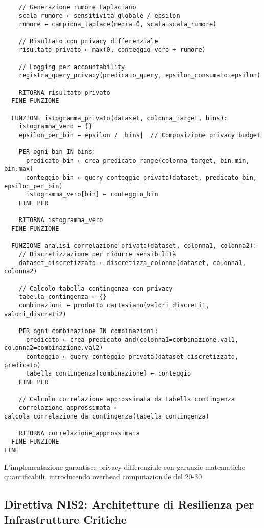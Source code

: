 {\begin{verbatim}
    // Generazione rumore Laplaciano
    scala_rumore ← sensitività_globale / epsilon
    rumore ← campiona_laplace(media=0, scala=scala_rumore)
    
    // Risultato con privacy differenziale
    risultato_privato ← max(0, conteggio_vero + rumore)
    
    // Logging per accountability
    registra_query_privacy(predicato_query, epsilon_consumato=epsilon)
    
    RITORNA risultato_privato
  FINE FUNZIONE
  
  FUNZIONE istogramma_privato(dataset, colonna_target, bins):
    istogramma_vero ← {}
    epsilon_per_bin ← epsilon / |bins|  // Composizione privacy budget
    
    PER ogni bin IN bins:
      predicato_bin ← crea_predicato_range(colonna_target, bin.min, bin.max)
      conteggio_bin ← query_conteggio_privata(dataset, predicato_bin, epsilon_per_bin)
      istogramma_vero[bin] ← conteggio_bin
    FINE PER
    
    RITORNA istogramma_vero
  FINE FUNZIONE
  
  FUNZIONE analisi_correlazione_privata(dataset, colonna1, colonna2):
    // Discretizzazione per ridurre sensibilità
    dataset_discretizzato ← discretizza_colonne(dataset, colonna1, colonna2)
    
    // Calcolo tabella contingenza con privacy
    tabella_contingenza ← {}
    combinazioni ← prodotto_cartesiano(valori_discreti1, valori_discreti2)
    
    PER ogni combinazione IN combinazioni:
      predicato ← crea_predicato_and(colonna1=combinazione.val1, colonna2=combinazione.val2)
      conteggio ← query_conteggio_privata(dataset_discretizzato, predicato)
      tabella_contingenza[combinazione] ← conteggio
    FINE PER
    
    // Calcolo correlazione approssimata da tabella contingenza
    correlazione_approssimata ← calcola_correlazione_da_contingenza(tabella_contingenza)
    
    RITORNA correlazione_approssimata
  FINE FUNZIONE
FINE
\end{verbatim}

L'implementazione garantisce privacy differenziale con garanzie matematiche quantificabili, introducendo overhead computazionale del 20-30%

\subsection{Direttiva NIS2: Architetture di Resilienza per Infrastrutture Critiche}

}
